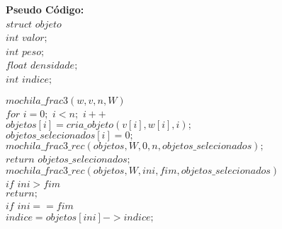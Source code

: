 \documentclass[10pt,a4paper]{article}
\begin{document}
   \textbf{Pseudo Código: }\\
	
	$struct$ $objeto${\\
	
	\hspace{1cm}$int$ $valor;$\\
	
	\hspace{1cm}$int$ $peso;$\\
	
	\hspace{1cm}$float$ $densidade;$\\
	
	\hspace{1cm}$int$ $indice;$\\
	
	}
	
	$mochila\_frac3(w,v,n,W)$\\

	\hspace{1cm}$for$ $i=0;$ $i<n;$ $i++$\\

	\hspace{2cm}$objetos[i] = cria\_objeto(v[i],w[i],i);$\\
	
	\hspace{2cm}$objetos\_selecionados[i] = 0;$\\

	\hspace{1cm}$mochila\_frac3\_rec(objetos, W, 0, n, objetos\_selecionados);$\\

	\hspace{1cm}$return$ $objetos\_selecionados;$\\
	
	
	$mochila\_frac3\_rec(objetos,W,ini,fim, objetos\_selecionados)$\\

	\hspace{1cm}$if$ $ini > fim$\\

	\hspace{2cm}$return;$\\
	

		\hspace{1cm}$if$ $ini == fim$\\

	\hspace{2cm}$indice = objetos[ini]->indice;$\\
	
\end{document}
